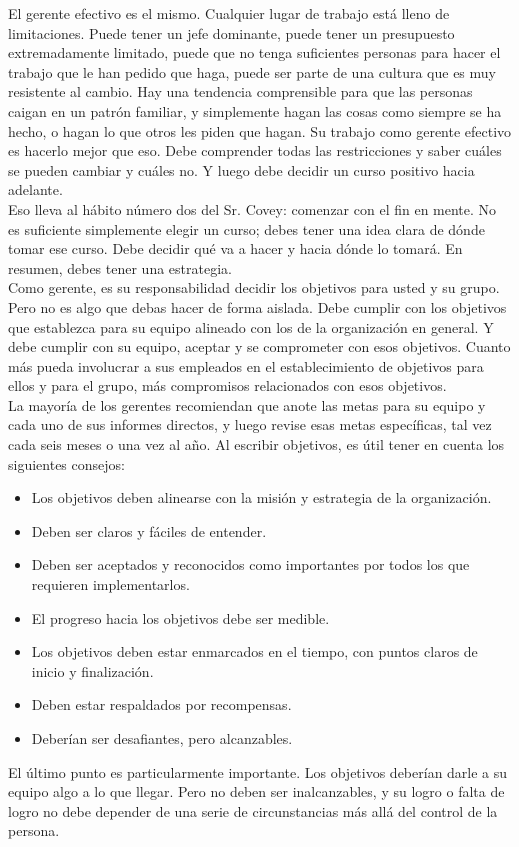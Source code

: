 \documentclass[10pt]{book}
\begin{document}
El gerente efectivo es el mismo. Cualquier lugar de trabajo está lleno de limitaciones. Puede tener un jefe dominante, puede tener un presupuesto extremadamente limitado, puede que no tenga suficientes personas para hacer el trabajo que le han pedido que haga, puede ser parte de una cultura que es muy resistente al cambio. Hay una tendencia comprensible para que las personas caigan en un patrón familiar, y simplemente hagan las cosas como siempre se ha hecho, o hagan lo que otros les piden que hagan. Su trabajo como gerente efectivo es hacerlo mejor que eso. Debe comprender todas las restricciones y saber cuáles se pueden cambiar y cuáles no. Y luego debe decidir un curso positivo hacia adelante.\\
Eso lleva al hábito número dos del Sr. Covey: comenzar con el fin en mente. No es suficiente simplemente elegir un curso; debes tener una idea clara de dónde tomar ese curso. Debe decidir qué va a hacer y hacia dónde lo tomará. En resumen, debes tener una estrategia.\\
Como gerente, es su responsabilidad decidir los objetivos para usted y su grupo. Pero no es algo que debas hacer de forma aislada. Debe cumplir con los objetivos que establezca para su equipo alineado con los de la organización en general. Y debe cumplir con su equipo, aceptar y se comprometer con esos objetivos. Cuanto más pueda involucrar a sus empleados en el establecimiento de objetivos para ellos y para el grupo, más compromisos relacionados con esos objetivos.\\
La mayoría de los gerentes recomiendan que anote las metas para su equipo y cada uno de sus informes directos, y luego revise esas metas específicas, tal vez cada seis meses o una vez al año. Al escribir objetivos, es útil tener en cuenta los siguientes consejos:
\begin{itemize}
\item Los objetivos deben alinearse con la misión y estrategia de la organización.
\item Deben ser claros y fáciles de entender.
\item Deben ser aceptados y reconocidos como importantes por todos los que requieren implementarlos.
\item El progreso hacia los objetivos debe ser medible.
\item Los objetivos deben estar enmarcados en el tiempo, con puntos claros de inicio y finalización.
\item Deben estar respaldados por recompensas.
\item Deberían ser desafiantes, pero alcanzables.
\end{itemize}
El último punto es particularmente importante. Los objetivos deberían darle a su equipo algo a lo que llegar. Pero no deben ser inalcanzables, y su logro o falta de logro no debe depender de una serie de circunstancias más allá del control de la persona.
\end{document}
